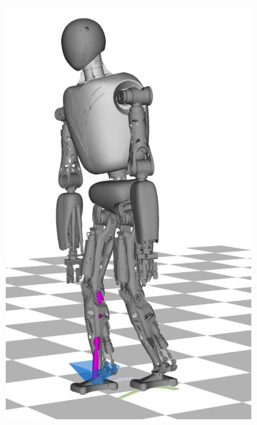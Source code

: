 \begin{figure}
\begin{subfigure}{.16\textwidth}
	\includegraphics[width=.95\linewidth]{fig/walkDynamic/snaps/6}
	\caption{}
\end{subfigure}%
\begin{subfigure}{.16\textwidth}

\end{subfigure}
\end{figure}

